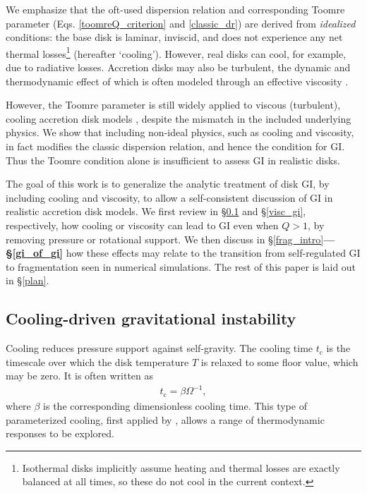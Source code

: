 \documentclass[iop, numberedappendix]{emulateapj}
\newcommand{\p}{\partial}
\newcommand{\tcool}{t_\mathrm{c}}
\begin{document}
We emphasize that the oft-used dispersion relation and corresponding
Toomre parameter (Eqs. \ref{toomreQ_criterion} and \ref{classic_dr})
are derived from \emph{idealized} conditions:  
the base disk is laminar, inviscid, and does not experience any net thermal 
losses\footnote{Isothermal disks implicitly assume  
  heating and thermal losses are exactly balanced at all 
  times, so these do not cool in the current context.} 
(hereafter `cooling').  
However, real disks can cool, for example, %
due to radiative losses. Accretion disks may also be turbulent, the 
dynamic and thermodynamic effect of which is often modeled through an 
effective viscosity \citep{shakura73,lin87,armitage01,rafikov15}. 

However, the Toomre parameter  
is still widely applied to viscous (turbulent), cooling
accretion disk models \citep[e.g.][]{gammie01,cossins09, kimura12}, 
despite the mismatch in the included underlying physics. 
We show that including non-ideal physics, such as cooling and
viscosity, in fact modifies the classic dispersion 
relation, and hence the condition for GI. Thus the Toomre condition
alone is insufficient to assess GI in realistic disks.  

The goal of this work is to generalize the analytic treatment of disk
GI, by including cooling and viscosity, to allow 
a self-consistent discussion of GI in realistic accretion disk
models.  
We first review in \S\ref{cool_gi} and \S\ref{visc_gi}, respectively,  
how cooling or viscosity can lead to GI even when $Q>1$, by removing
pressure or rotational support. We then 
discuss in \S\ref{frag_intro}{\bf---\S\ref{gi_of_gi}} how these
effects may relate to the transition from self-regulated GI to
fragmentation seen in numerical simulations. The rest of this paper is
laid out in \S\ref{plan}.    



\subsection{Cooling-driven gravitational instability}\label{cool_gi}
Cooling reduces pressure support against self-gravity. The
cooling time  
$\tcool$ is the timescale over which the disk temperature $T$ is relaxed
to some floor value, which may be zero. 
 It is often written as 
\begin{align} \label{beta_def}
  \tcool = \beta \Omega^{-1},
\end{align}
where $\beta$ is the corresponding dimensionless cooling time. This
type of parameterized cooling, first applied by \cite{gammie01},
allows a range of thermodynamic responses to be explored. 
\end{document}
